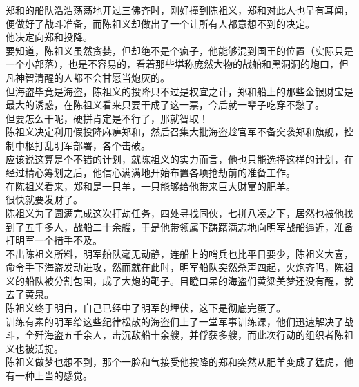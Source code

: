 \begin{multicols}{\theparacolNo}
郑和的船队浩浩荡荡地开过三佛齐时，刚好撞到陈祖义，郑和对此人也早有耳闻，便做好了战斗准备，而陈祖义却做出了一个让所有人都意想不到的决定。\\

他决定向郑和投降。\\

要知道，陈祖义虽然贪婪，但却绝不是个疯子，他能够混到国王的位置（实际只是一个小部落），也是不容易的，看着那些堪称庞然大物的战船和黑洞洞的炮口，但凡神智清醒的人都不会甘愿当炮灰的。\\

但海盗毕竟是海盗，陈祖义的投降只不过是权宜之计，郑和船上的那些金银财宝是最大的诱惑，在陈祖义看来只要干成了这一票，今后就一辈子吃穿不愁了。\\

但要怎么干呢，硬拼肯定是不行了，那就智取！\\

陈祖义决定利用假投降麻痹郑和，然后召集大批海盗趁官军不备突袭郑和旗舰，控制中枢打乱明军部署，各个击破。\\

应该说这算是个不错的计划，就陈祖义的实力而言，他也只能选择这样的计划，在经过精心筹划之后，他信心满满地开始布置各项抢劫前的准备工作。\\

在陈祖义看来，郑和是一只羊，一只能够给他带来巨大财富的肥羊。\\

很快就要发财了。\\

陈祖义为了圆满完成这次打劫任务，四处寻找同伙，七拼八凑之下，居然也被他找到了五千多人，战船二十余艘，于是他带领属下踌躇满志地向明军战船逼近，准备打明军一个措手不及。\\

不出陈祖义所料，明军船队毫无动静，连船上的哨兵也比平日要少，陈祖义大喜，命令手下海盗发动进攻，然而就在此时，明军船队突然杀声四起，火炮齐鸣，陈祖义的船队被分割包围，成了大炮的靶子。目瞪口呆的海盗们黄粱美梦还没有醒，就去了黄泉。\\

陈祖义终于明白，自己已经中了明军的埋伏，这下是彻底完蛋了。\\

训练有素的明军给这些纪律松散的海盗们上了一堂军事训练课，他们迅速解决了战斗，全歼海盗五千余人，击沉敌船十余艘，并俘获多艘，而此次行动的组织者陈祖义也被活捉。\\

陈祖义做梦也想不到，那个一脸和气接受他投降的郑和突然从肥羊变成了猛虎，他有一种上当的感觉。\\


\end{multicols}
